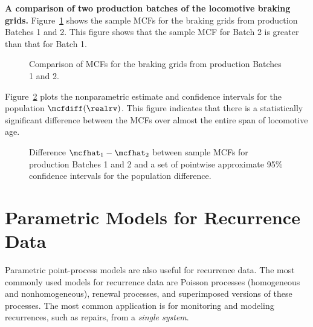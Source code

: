 \begin{example}
{\bf A comparison of two production batches of the
locomotive braking grids.}
Figure~\ref{figure:grids.compare.ps} shows the sample MCFs for the
braking grids from production Batches 1 and 2. This figure shows that
the sample MCF for Batch 2 is greater than that for Batch 1.
\begin{figure}
\caption{Comparison of MCFs for the braking grids from 
production Batches 1 and 2.}
\label{figure:grids.compare.ps}
\end{figure}
Figure~\ref{figure:grids.diff.ps} plots the nonparametric estimate 
and confidence intervals for the population
$\mcfdiff(\realrv)$. This figure indicates that there is a statistically
significant difference between the MCFs over almost the entire
span of locomotive age.
\begin{figure}
\caption{Difference $\mcfhat_{1}-\mcfhat_{2}$ 
between sample MCFs for production Batches 1 and 2 and a set of
pointwise approximate 95\% confidence intervals for the population
difference.}
\label{figure:grids.diff.ps}
\end{figure}
\end{example}

\section{Parametric Models for Recurrence Data}
\label{section:param.mcf.models}
Parametric point-process models are also useful
for recurrence data. The most commonly used models for recurrence
data are Poisson processes (homogeneous and nonhomogeneous),
renewal processes, and superimposed versions of these processes.
The most common application is for monitoring and modeling
recurrences,
such as repairs,
from a {\em single system}.

